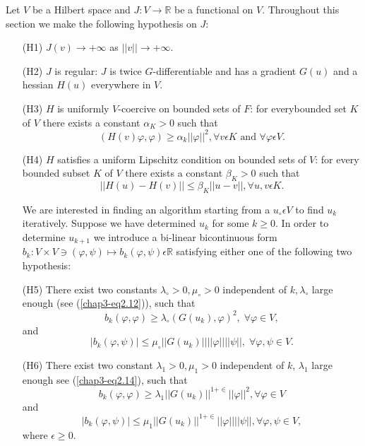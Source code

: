 Let $V$ be a Hilbert space and $J : V \to \mathbb{R}$ be a functional on $V$. Throughout this section we make the following hypothesis on $J$:
\begin{enumerate}
\item[(H1)] $J(v) \to + \infty$ as $||v|| \to + \infty$.

\item[(H2)] $J$ is regular: $J$ is twice $G$-differentiable and has a gradient $G(u)$ and a hessian $H(u)$ everywhere in $V$.

\item[(H3)] $H$ is uniformly $V$-coercive on bounded sets of $F$: for every\break bounded set $K$ of $V$ there exists a constant $\alpha_{K} > 0$ such that
$$
(H(v) \varphi, \varphi) \geq \alpha_{k} ||\varphi||^{2}, \forall v \epsilon K \text{ and } \forall \varphi \epsilon V.
$$

\item[(H4)] $H$ satisfies a uniform Lipschitz condition on bounded sets of $V$: for every bounded subset $K$ of $V$ there exists a constant $\beta_{K} > 0$ such that
$$
||H(u) - H(v)|| \leq \beta_{K} ||u-v||, \forall u, v \epsilon K.
$$

We are interested in finding an algorithm starting from a $u_{\circ} \epsilon V$ to find $u_{k}$ iteratively. Suppose we have determined $u_{k}$ for some $k \geq 0$. In order to determine $u_{k+1}$ we introduce a bi-linear bicontinuous form $b_{k} : V \times V \ni (\varphi, \psi) \mapsto b_{k} (\varphi, \psi) \epsilon \mathbb{R}$ satisfying either one of the following two hypothesis:

\item[(H5)] There exist two constants $\lambda_{\circ} > 0, \mu_{\circ} > 0$ independent of $k, \lambda_{\circ}$ large enough (see (\ref{chap3-eq2.12})), such that
$$
b_{k} (\varphi, \varphi) \geq \lambda_{\circ} (G(u_{k}), \varphi)^{2}, \; \forall \varphi \in V,
$$
and
$$
|b_{k} (\varphi, \psi)| \leq \mu_{\circ} ||G(u_{k})|| ||\varphi|| ||\psi||,\; \forall \varphi, \psi \in V.
$$\pageoriginale

\item[(H6)] There exist two constant $\lambda_{1} > 0, \mu_{1} > 0$ independent of $k$, $\lambda_{1}$ large enough see (\ref{chap3-eq2.14}), such that
$$
b_{k} (\varphi, \varphi) \geq \lambda_{1} ||G(u_{k})||^{1+\in} ||\varphi||^{2}, \forall \varphi \in V
$$
and
$$
|b_{k} (\varphi, \psi)| \leq \mu_{1} ||G(u_{k})||^{1+\in} ||\varphi|| ||\psi||, \forall \varphi, \psi \in V,
$$
where $\epsilon \geq 0$.
\end{enumerate}

